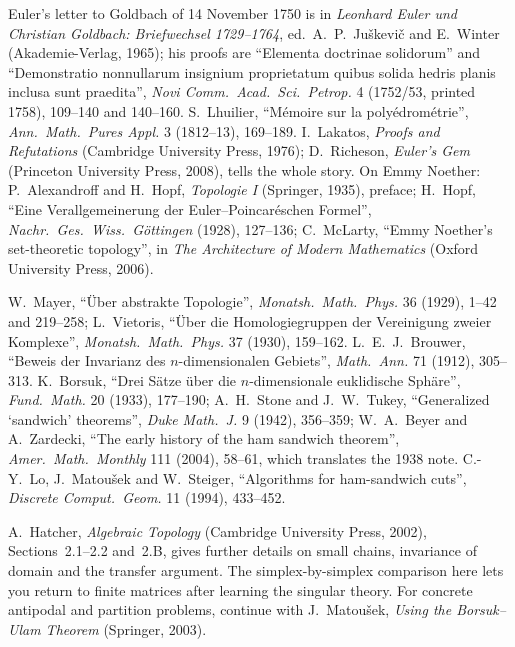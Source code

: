 Euler's letter to Goldbach of 14 November 1750 is in \emph{Leonhard Euler und Christian Goldbach: Briefwechsel 1729--1764}, ed.\ A.~P.~Juškevič and E.~Winter (Akademie-Verlag, 1965); his proofs
are ``Elementa doctrinae solidorum'' and ``Demonstratio nonnullarum insignium proprietatum quibus solida hedris planis inclusa sunt praedita'', \emph{Novi Comm.\ Acad.\ Sci.\ Petrop.} 4 (1752/53, printed 1758),
109--140 and 140--160. S.~Lhuilier, ``M\'emoire sur la poly\'edrom\'etrie'', \emph{Ann.\ Math.\ Pures Appl.} 3 (1812--13), 169--189. I.~Lakatos, \emph{Proofs and Refutations} (Cambridge University Press, 1976);
D.~Richeson, \emph{Euler's Gem} (Princeton University Press, 2008), tells the whole story. On Emmy Noether: P.~Alexandroff and H.~Hopf, \emph{Topologie I} (Springer, 1935), preface; H.~Hopf, ``Eine
Verallgemeinerung der Euler--Poincar\'eschen Formel'', \emph{Nachr.\ Ges.\ Wiss.\ G\"ottingen} (1928), 127--136; C.~McLarty, ``Emmy Noether's set-theoretic topology'', in \emph{The Architecture of Modern
Mathematics} (Oxford University Press, 2006).

W.~Mayer, ``\"Uber abstrakte Topologie'', \emph{Monatsh.\ Math.\ Phys.} 36 (1929), 1--42 and 219--258; L.~Vietoris, ``\"Uber die Homologiegruppen der Vereinigung zweier Komplexe'', \emph{Monatsh.\ Math.\ Phys.}
37 (1930), 159--162. L.~E.~J.~Brouwer, ``Beweis der Invarianz des $n$-dimensionalen Gebiets'', \emph{Math.\ Ann.} 71 (1912), 305--313. K.~Borsuk, ``Drei S\"atze \"uber die $n$-dimensionale euklidische Sph\"are'',
\emph{Fund.\ Math.} 20 (1933), 177--190; A.~H.~Stone and J.~W.~Tukey, ``Generalized `sandwich' theorems'', \emph{Duke Math.\ J.} 9 (1942), 356--359; W.~A.~Beyer and A.~Zardecki, ``The early history of the ham sandwich theorem'', \emph{Amer.\ Math.\ Monthly} 111 (2004), 58--61, which translates the 1938 note. C.-Y.~Lo, J.~Matou\v sek and W.~Steiger, ``Algorithms for ham-sandwich cuts'', \emph{Discrete Comput.\ Geom.} 11 (1994), 433--452.

A.~Hatcher, \emph{Algebraic Topology} (Cambridge University Press, 2002), Sections~2.1--2.2 and~2.B, gives further details on small chains, invariance of domain and the transfer argument. The simplex-by-simplex comparison here lets you return to finite matrices after learning the singular theory. For concrete antipodal and partition problems, continue with J.~Matou\v sek, \emph{Using the Borsuk--Ulam Theorem} (Springer, 2003).
